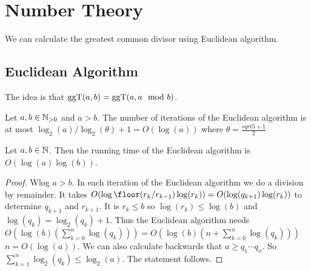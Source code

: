 \section{Number Theory}
We can calculate the greatest common divisor using Euclidean algorithm.
\subsection{Euclidean Algorithm}
The idea is that \(\operatorname{ggT}(a,b)=\operatorname{ggT}(a,a\mod b)\).
\begin{Satz} Let \(a,b\in\mathbb{N}_{>0}\) and \(a>b\). The number of iterations of the Euclidean algorithm is at most \(\log_2(a)/\log_2(\theta)+1=O(\log(a))\) where \(\theta=\frac{sqrt{5}+1}{2}\)
\end{Satz}
\begin{Satz} Let \(a,b\in\mathbb{N}\). Then the running time of the Euclidean algorithm is \(O(\log(a)\log(b))\).
\end{Satz}
\begin{proof} Wlog \(a>b\). In each iteration of the Euclidean algorithm we do a division by remainder. It takes \(O(\log\floor(r_k/r_{k-1})\log(r_k))=O(\log(q_{k+1})\log(r_k))\) to determine \(q_{k+1}\) and \(r_{k+1}\).
It is \(r_k\leq b\) so \(\log(r_k)\leq\log(b)\) and \(\log(q_k)=\log_2(q_k)+1\). Thus the Euclidean algorithm needs \(O(\log(b)(\sum_{k=0}^n\log(q_k)))=O(\log(b)(n+\sum_{k=0}^n\log(q_k)))\)
\(n=O(\log(a))\).
We can also calculate backwards that \(a\geq q_1\cdots q_n\). 
So \(\sum_{k=1}^n \log_2(q_k)\leq \log_2(a)\).
The statement follows.
\end{proof}
